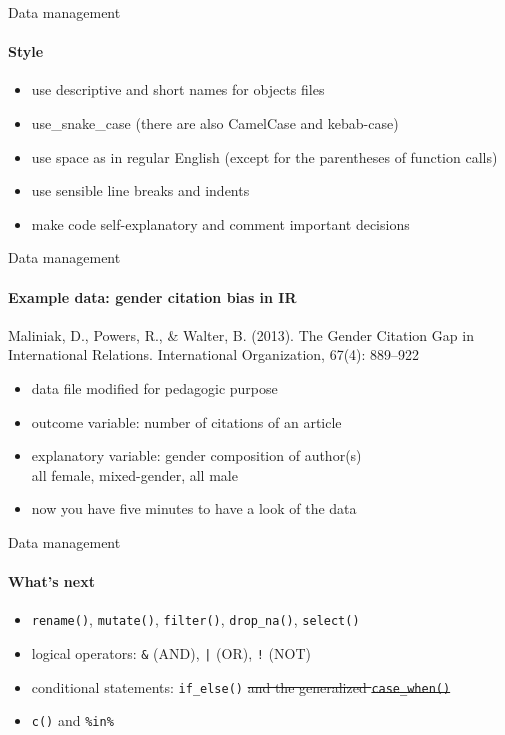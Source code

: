 \documentclass{beamer}
\begin{document}
\begin{frame}{Data management}
\framesubtitle{Style}
\begin{itemize}
    \item use descriptive and short names for objects files
    \item use\_snake\_case (there are also CamelCase and kebab-case)
    \item use space as in regular English (except for the parentheses of function calls)
    \item use sensible line breaks and indents
    \item make code self-explanatory and comment important decisions
\end{itemize}
\end{frame}

\begin{frame}{Data management}
\framesubtitle{Example data: gender citation bias in IR}
Maliniak, D., Powers, R., \& Walter, B. (2013). The Gender Citation Gap in International Relations. International Organization, 67(4): 889--922
\begin{itemize}
    \item data file modified for pedagogic purpose
    \item outcome variable: number of citations of an article
    \item explanatory variable: gender composition of author(s)\\ all female, mixed-gender, all male
    \item now you have five minutes to have a look of the data
\end{itemize}
\end{frame}

\begin{frame}{Data management}
\framesubtitle{What's next}
\begin{itemize}
    \item \texttt{rename()}, \texttt{mutate()}, \texttt{filter()}, \texttt{drop\_na()}, \texttt{select()}
    \item logical operators: \texttt{\&} (AND), \texttt{|} (OR), \texttt{!} (NOT)
    \item conditional statements: \texttt{if\_else()} \sout{and the generalized \texttt{case\_when()}}
    \item \texttt{c()} and \texttt{\%in\%}
\end{itemize}
\end{frame}
\end{document}
